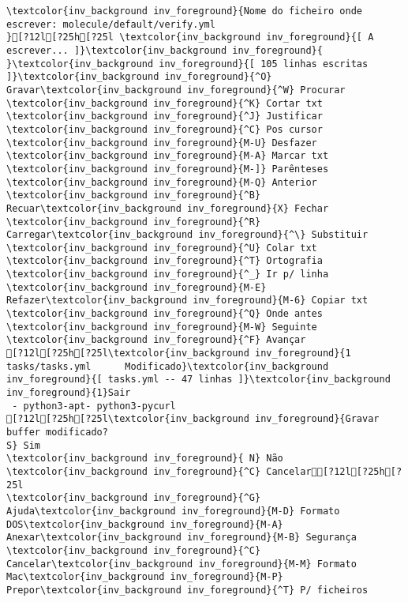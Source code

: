 \documentclass{scrartcl}
\begin{document}
\begin{Verbatim}
\textcolor{inv_background inv_foreground}{Nome do ficheiro onde escrever: molecule/default/verify.yml                                                                                                                                  }[?12l[?25h[?25l \textcolor{inv_background inv_foreground}{[ A escrever... ]}\textcolor{inv_background inv_foreground}{          }\textcolor{inv_background inv_foreground}{[ 105 linhas escritas ]}\textcolor{inv_background inv_foreground}{^O} Gravar\textcolor{inv_background inv_foreground}{^W} Procurar      \textcolor{inv_background inv_foreground}{^K} Cortar txt    \textcolor{inv_background inv_foreground}{^J} Justificar    \textcolor{inv_background inv_foreground}{^C} Pos cursor    \textcolor{inv_background inv_foreground}{M-U} Desfazer     \textcolor{inv_background inv_foreground}{M-A} Marcar txt   \textcolor{inv_background inv_foreground}{M-]} Parênteses   \textcolor{inv_background inv_foreground}{M-Q} Anterior     \textcolor{inv_background inv_foreground}{^B} Recuar\textcolor{inv_background inv_foreground}{X} Fechar  \textcolor{inv_background inv_foreground}{^R} Carregar\textcolor{inv_background inv_foreground}{^\} Substituir    \textcolor{inv_background inv_foreground}{^U} Colar txt     \textcolor{inv_background inv_foreground}{^T} Ortografia    \textcolor{inv_background inv_foreground}{^_} Ir p/ linha   \textcolor{inv_background inv_foreground}{M-E} Refazer\textcolor{inv_background inv_foreground}{M-6} Copiar txt   \textcolor{inv_background inv_foreground}{^Q} Onde antes    \textcolor{inv_background inv_foreground}{M-W} Seguinte     \textcolor{inv_background inv_foreground}{^F} Avançar
[?12l[?25h[?25l\textcolor{inv_background inv_foreground}{1      tasks/tasks.yml      Modificado}\textcolor{inv_background inv_foreground}{[ tasks.yml -- 47 linhas ]}\textcolor{inv_background inv_foreground}{1}Sair  
 - python3-apt- python3-pycurl
[?12l[?25h[?25l\textcolor{inv_background inv_foreground}{Gravar buffer modificado?                                                                                                                                                                     S} Sim
\textcolor{inv_background inv_foreground}{ N} Não \textcolor{inv_background inv_foreground}{^C} Cancelar[?12l[?25h[?25l
\textcolor{inv_background inv_foreground}{^G} Ajuda\textcolor{inv_background inv_foreground}{M-D} Formato DOS\textcolor{inv_background inv_foreground}{M-A} Anexar\textcolor{inv_background inv_foreground}{M-B} Segurança
\textcolor{inv_background inv_foreground}{^C} Cancelar\textcolor{inv_background inv_foreground}{M-M} Formato Mac\textcolor{inv_background inv_foreground}{M-P} Prepor\textcolor{inv_background inv_foreground}{^T} P/ ficheiros

\end{Verbatim}
\end{document}
